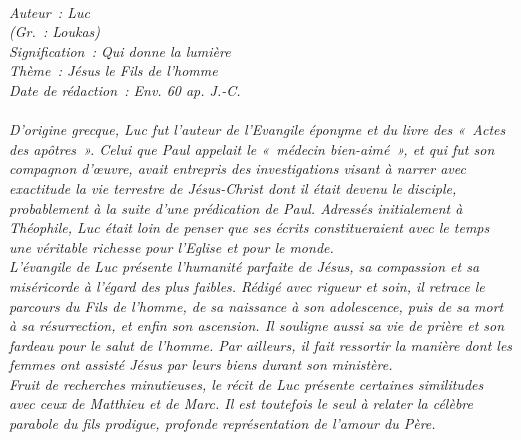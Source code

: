 \BFont
\noindent\hrulefill
{\footnotesize
\textit{
\bigskip
{\centering{}
\\Auteur~: Luc
\\(Gr.~: Loukas)
\\Signification~: Qui donne la lumière
\\Thème~: Jésus le Fils de l'homme
\\Date de rédaction~: Env. 60 ap. J.-C.\\}
}
\textit{
\\D'origine grecque, Luc fut l'auteur de l'Evangile éponyme et du livre des «~Actes des apôtres~». Celui que Paul appelait le «~médecin bien-aimé~», et qui fut son compagnon d'œuvre, avait entrepris des investigations visant à narrer avec exactitude la vie terrestre de Jésus-Christ dont il était devenu le disciple, probablement à la suite d'une prédication de Paul. Adressés initialement à Théophile, Luc était loin de penser que ses écrits constitueraient avec le temps une véritable richesse pour l'Eglise et pour le monde.
\\L'évangile de Luc présente l'humanité parfaite de Jésus, sa compassion et sa miséricorde à l'égard des plus faibles. Rédigé avec rigueur et soin, il retrace le parcours du Fils de l'homme, de sa naissance à son adolescence, puis de sa mort à sa résurrection, et enfin son ascension. Il souligne aussi sa vie de prière et son fardeau pour le salut de l'homme. Par ailleurs, il fait ressortir la manière dont les femmes ont assisté Jésus par leurs biens durant son ministère.
\\Fruit de recherches minutieuses, le récit de Luc présente certaines similitudes avec ceux de Matthieu et de Marc. Il est toutefois le seul à relater la célèbre parabole du fils prodigue, profonde représentation de l'amour du Père.\bigskip
}
}
\par\nobreak\noindent\hrulefill
